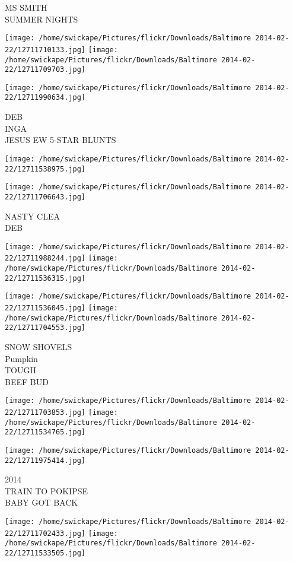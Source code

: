 \documentclass[10pt,letterpaper]{article}
\begin{document}
MS SMITH\\
SUMMER NIGHTS
\pagebreak

\texttt{[image: /home/swickape/Pictures/flickr/Downloads/Baltimore 2014-02-22/12711710133.jpg]}
\texttt{[image: /home/swickape/Pictures/flickr/Downloads/Baltimore 2014-02-22/12711709703.jpg]}

\texttt{[image: /home/swickape/Pictures/flickr/Downloads/Baltimore 2014-02-22/12711990634.jpg]}

DEB\\
INGA\\
JESUS EW 5{-}STAR BLUNTS
\pagebreak

\texttt{[image: /home/swickape/Pictures/flickr/Downloads/Baltimore 2014-02-22/12711538975.jpg]}

\vspace{0.25in}
\texttt{[image: /home/swickape/Pictures/flickr/Downloads/Baltimore 2014-02-22/12711706643.jpg]}

NASTY CLEA\\
DEB
\pagebreak

\texttt{[image: /home/swickape/Pictures/flickr/Downloads/Baltimore 2014-02-22/12711988244.jpg]}
\texttt{[image: /home/swickape/Pictures/flickr/Downloads/Baltimore 2014-02-22/12711536315.jpg]}

\texttt{[image: /home/swickape/Pictures/flickr/Downloads/Baltimore 2014-02-22/12711536045.jpg]}
\texttt{[image: /home/swickape/Pictures/flickr/Downloads/Baltimore 2014-02-22/12711704553.jpg]}

SNOW SHOVELS\\
Pumpkin\\
TOUGH\\
BEEF BUD
\pagebreak

\texttt{[image: /home/swickape/Pictures/flickr/Downloads/Baltimore 2014-02-22/12711703853.jpg]}
\texttt{[image: /home/swickape/Pictures/flickr/Downloads/Baltimore 2014-02-22/12711534765.jpg]}

\vspace{0.25in}
\texttt{[image: /home/swickape/Pictures/flickr/Downloads/Baltimore 2014-02-22/12711975414.jpg]}

2014\\
TRAIN TO POKIPSE\\
BABY GOT BACK
\pagebreak

\texttt{[image: /home/swickape/Pictures/flickr/Downloads/Baltimore 2014-02-22/12711702433.jpg]}
\texttt{[image: /home/swickape/Pictures/flickr/Downloads/Baltimore 2014-02-22/12711533505.jpg]}
\end{document}
